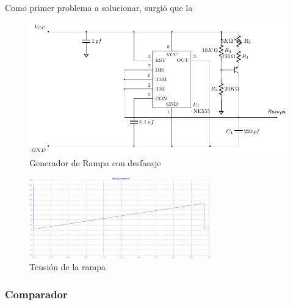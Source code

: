 Como primer problema a solucionar, surgió que la
\begin{figure}[H]
\centering
\includegraphics[scale=0.8]{Ejercicio8/Circuitos/Generador_de_rampa.pdf}
\caption{Generador de Rampa con desfasaje}
\label{fig:Generador_de_rampa}
\end{figure}

\begin{figure}[H]
\centering
\includegraphics[width=0.7\textwidth]{Ejercicio8/Imagenes/Rampa_desfasada}
\caption{Tensión de la rampa}
\label{fig:Generador_de_rampa_LTSpice}
\end{figure}


\subsubsection{Comparador}

